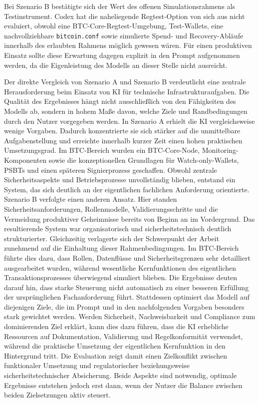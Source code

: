 {Bei Szenario B bestätigte sich der Wert des offenen Simulationsrahmens als Testinstrument. Codex hat die naheliegende Regtest-Option von sich aus nicht evaluiert, obwohl eine \ac{BTC}-Core-Regtest-Umgebung, Test-Wallets, eine nachvollziehbare \texttt{bitcoin.conf} sowie simulierte Spend- und Recovery-Abläufe innerhalb des erlaubten Rahmens möglich gewesen wären. 
Für einen produktiven Einsatz sollte diese Erwartung dagegen explizit in den Prompt aufgenommen werden, da die Eigenleistung des Modells an dieser Stelle nicht ausreicht.

Der direkte Vergleich von Szenario A und Szenario B verdeutlicht eine zentrale Herausforderung beim Einsatz von \ac{KI} für technische Infrastrukturaufgaben. Die Qualität des Ergebnisses hängt nicht ausschließlich von den Fähigkeiten des Modells ab, sondern in hohem Maße davon, welche Ziele und Randbedingungen durch den Nutzer vorgegeben werden. In Szenario A erhielt die \ac{KI} vergleichsweise wenige Vorgaben. Dadurch konzentrierte sie sich stärker auf die unmittelbare Aufgabenstellung und erreichte innerhalb kurzer Zeit einen hohen praktischen Umsetzungsgrad. Im \ac{BTC}-Bereich wurden ein \ac{BTC}-Core-Node, Monitoring-Komponenten sowie die konzeptionellen Grundlagen für Watch-only-Wallets, \acp{PSBT} und einen späteren Signierprozess geschaffen. Obwohl zentrale Sicherheitsaspekte und Betriebsprozesse unvollständig blieben, entstand ein System, das sich deutlich an der eigentlichen fachlichen Anforderung orientierte. Szenario B verfolgte einen anderen Ansatz. Hier standen Sicherheitsanforderungen, Rollenmodelle, Validierungsschritte und die Vermeidung produktiver Geheimnisse bereits von Beginn an im Vordergrund. Das resultierende System war organisatorisch und sicherheitstechnisch deutlich strukturierter. Gleichzeitig verlagerte sich der Schwerpunkt der Arbeit zunehmend auf die Einhaltung dieser Rahmenbedingungen. Im \ac{BTC}-Bereich führte dies dazu, dass Rollen, Datenflüsse und Sicherheitsgrenzen sehr detailliert ausgearbeitet wurden, während wesentliche Kernfunktionen des eigentlichen Transaktionsprozesses überwiegend simuliert blieben. Die Ergebnisse deuten darauf hin, dass starke Steuerung nicht automatisch zu einer besseren Erfüllung der ursprünglichen Fachanforderung führt. Stattdessen optimiert das Modell auf diejenigen Ziele, die im Prompt und in den nachfolgenden Vorgaben besonders stark gewichtet werden. Werden Sicherheit, Nachweisbarkeit und Compliance zum dominierenden Ziel erklärt, kann dies dazu führen, dass die \ac{KI} erhebliche Ressourcen auf Dokumentation, Validierung und Regelkonformität verwendet, während die praktische Umsetzung der eigentlichen Kernfunktion in den Hintergrund tritt. Die Evaluation zeigt damit einen Zielkonflikt zwischen funktionaler Umsetzung und regulatorischer beziehungsweise sicherheitstechnischer Absicherung. Beide Aspekte sind notwendig, optimale Ergebnisse entstehen jedoch erst dann, wenn der Nutzer die Balance zwischen beiden Zielsetzungen aktiv steuert.

}
